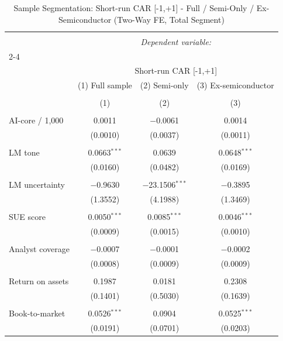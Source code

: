 
\begin{table}[!htbp] \centering 
  \caption{Sample Segmentation: Short-run CAR [-1,+1] - Full / Semi-Only / Ex-Semiconductor (Two-Way FE, Total Segment)} 
  \label{} 
\begin{tabular}{@{\extracolsep{5pt}}lccc} 
\\[-1.8ex]\hline 
\hline \\[-1.8ex] 
 & \multicolumn{3}{c}{\textit{Dependent variable:}} \\ 
\cline{2-4} 
\\[-1.8ex] & \multicolumn{3}{c}{Short-run CAR [-1,+1]} \\ 
 & (1) Full sample & (2) Semi-only & (3) Ex-semiconductor \\ 
\\[-1.8ex] & (1) & (2) & (3)\\ 
\hline \\[-1.8ex] 
 AI-core / 1,000 & 0.0011 & $-$0.0061 & 0.0014 \\ 
  & (0.0010) & (0.0037) & (0.0011) \\ 
  & & & \\ 
 LM tone & 0.0663$^{***}$ & 0.0639 & 0.0648$^{***}$ \\ 
  & (0.0160) & (0.0482) & (0.0169) \\ 
  & & & \\ 
 LM uncertainty & $-$0.9630 & $-$23.1506$^{***}$ & $-$0.3895 \\ 
  & (1.3552) & (4.1988) & (1.3469) \\ 
  & & & \\ 
 SUE score & 0.0050$^{***}$ & 0.0085$^{***}$ & 0.0046$^{***}$ \\ 
  & (0.0009) & (0.0015) & (0.0010) \\ 
  & & & \\ 
 Analyst coverage & $-$0.0007 & $-$0.0001 & $-$0.0002 \\ 
  & (0.0008) & (0.0009) & (0.0009) \\ 
  & & & \\ 
 Return on assets & 0.1987 & 0.0181 & 0.2308 \\ 
  & (0.1401) & (0.5030) & (0.1639) \\ 
  & & & \\ 
 Book-to-market & 0.0526$^{***}$ & 0.0904 & 0.0525$^{***}$ \\ 
  & (0.0191) & (0.0701) & (0.0203) \\ 

\end{tabular}
\end{table}
